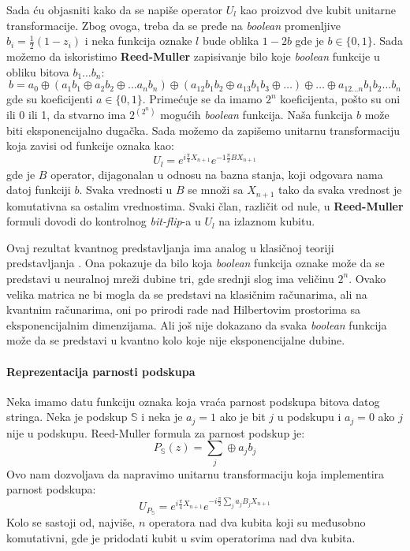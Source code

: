 \documentclass[12pt, letterpaper, oneside]{article}
\begin{document}
Sada ću objasniti kako da se napiše operator $U_l$ kao proizvod dve kubit unitarne transformacije. Zbog ovoga, treba da se pređe na \textit{boolean} promenljive $b_i=\frac{1}{2}(1-z_i)$ i 
neka funkcija oznake $l$ bude oblika $1-2b$ gde je $b \in \{0,1\}$. Sada možemo da iskoristimo \textbf{Reed-Muller} zapisivanje bilo koje \textit{boolean} funkcije u obliku bitova $b_1 \dots b_n$:
\[
    b = a_0 \oplus (a_1b_1 \oplus a_2b_2 \oplus \dots a_n b_n) \oplus (a_{12}b_1b_2 \oplus a_{13}b_1b_3 \oplus \dots) \oplus \dots \oplus a_{12 \dots n}b_1b_2 \dots b_n
\]
gde su koeficijenti $a \in \{0,1\}$. Primećuje se da imamo $2^n$ koeficijenta, pošto su oni ili 0 ili 1, da stvarno ima $2^{(2^n)}$ mogućih \textit{boolean} funkcija.
Naša funkcija $b$ može biti eksponencijalno dugačka. Sada možemo da zapišemo unitarnu transformaciju koja zavisi od funkcije oznaka kao:
\[
    U_l = e^{i\frac{\pi}{4}X_{n+1}}e^{-1\frac{\pi}{2}BX_{n+1}}
\]
gde je $B$ operator, dijagonalan u odnosu na bazna stanja, koji odgovara nama datoj funkciji $b$. 
Svaka vrednosti u $B$ se množi sa $X_{n+1}$ tako da svaka vrednost je komutativna sa ostalim vrednostima. 
Svaki član, različit od nule, u \textbf{Reed-Muller} formuli dovodi do kontrolnog \textit{bit-flip}-a u $U_l$ na izlaznom kubitu.

Ovaj rezultat kvantnog predstavljanja ima analog u klasičnoj teoriji predstavljanja \cite{Cybenko1989ApproximationBS}.
Ona pokazuje da bilo koja \textit{boolean} funkcija oznake može da se predstavi u neuralnoj mreži dubine tri, gde srednji slog ima veličinu $2^n$.
Ovako velika matrica ne bi mogla da se predstavi na klasičnim računarima, ali na kvantnim računarima, oni po prirodi rade
nad Hilbertovim prostorima sa eksponencijalnim dimenzijama. Ali još nije dokazano da svaka \textit{boolean} funkcija može da se predstavi u kvantno kolo koje nije eksponencijalne dubine.

\paragraph*{Reprezentacija parnosti podskupa}
Neka imamo datu funkciju oznaka koja vraća parnost podskupa bitova datog stringa. Neka je podskup $\mathbb{S}$
i neka je $a_j=1$ ako je bit $j$ u podskupu i $a_j=0$ ako $j$ nije u podskupu. Reed-Muller formula za parnost podskup je:
\[
    P_{\mathbb{S}}(z) = \sum_j \oplus a_j b_j
\]
Ovo nam dozvoljava da napravimo unitarnu transformaciju koja implementira parnost podskupa:
\[
    U_{P_{\mathbb{S}}} = e^{i\frac{\pi}{4}X_{n+1}}e^{-i\frac{\pi}{2}\sum_j a_jB_jX_{n+1}}
\]
Kolo se sastoji od, najviše, $n$ operatora nad dva kubita koji su međusobno komutativni, gde je pridodati kubit u svim operatorima nad dva kubita.
\end{document}
